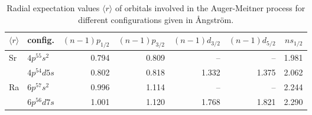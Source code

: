 \begin{table}[h]
 \centering
 \caption{Radial expectation values $\langle r \rangle$ of
          orbitals involved in the Auger-Meitner process
          for different configurations
          given in {\AA}ngstr{\"o}m.
}
 \begin{tabular}{llrrrrr}
  \toprule
   $\langle r \rangle$ &     config. &   $(n-1)p_{1/2}$ & $(n-1)p_{3/2}$ & $(n-1)d_{3/2}$ & $(n-1)d_{5/2}$ & $ns_{1/2}$\\
  \midrule
   \multirow{2}{*}{Sr} & $4p^55s^2$ & 0.794 &     0.809    &      --        &        --      &  1.981\\
       &      $4p^54d5s$ &            0.802 &     0.818    &    1.332       &      1.375     &  2.062\\
   \multirow{2}{*}{Ra} & $6p^57s^2$ & 0.996 &     1.114    &      --        &        --      &  2.244\\
       &      $6p^56d7s$ &            1.001 &     1.120    &    1.768       &      1.821     &  2.290\\
  \bottomrule
 \end{tabular}
 \label{tab:widths}
\end{table}
